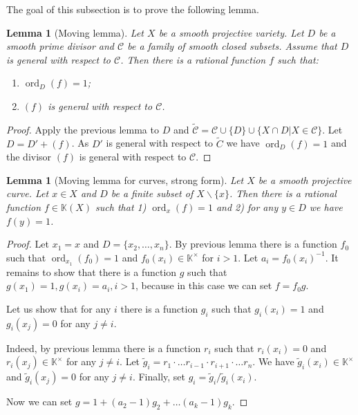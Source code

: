 \documentclass[12pt]{extarticle}
\newtheorem{lemma}[theorem]{Lemma}
\def\mb{\mathbb}
\def\mc{\mathcal}
\def\k{\mb K}
\def\t{\times}
\def\wt{\widetilde}
\def\bs{\backslash}
\DeclareMathOperator{\ord}{ord}
\begin{document}
The goal of this subsection is to prove the following lemma.

\begin{lemma}[Moving lemma]
\label{lemma:moving_lemma_final}
    Let $X$ be a smooth projective variety. Let $D$ be a smooth prime divisor and $\mc C$ be a family of smooth closed subsets. Assume that $D$ is general with respect to $\mc C$. Then there is a rational function $f$ such that:
    \begin{enumerate}
    \item $\ord_D(f)=1$;
        \item $(f)$ is general with respect to $\mc C$.
    \end{enumerate}
\end{lemma}

\begin{proof}
    Apply the previous lemma to $D$ and $\wt{\mc C}=\mc C\cup \{D\}\cup \{X\cap D|X\in \mc C\}$. Let $D=D'+(f)$. As $D'$ is general with respect to $\wt C$ we have $\ord_D(f)=1$ and the divisor $(f)$ is general with respect to $\mc C$.
\end{proof}

\begin{lemma}[Moving lemma for curves, strong form]
\label{lemma:moving_lemma_strong}
    Let $X$ be a smooth projective curve. Let $x\in X$ and $D$ be a finite subset of $X\bs\{x\}$. Then there is a rational function $f\in\k(X)$ such that 1) $\ord_x(f)=1$ and 2) for any $y\in D$ we have $f(y)=1$.
\end{lemma}

\begin{proof}
Let $x_1=x$ and $D=\{x_2,\dots, x_n\}$.
By previous lemma there is a function $f_0$ such that $\ord_{x_1}(f_0)=1$ and $f_0(x_i)\in\k^\t$ for $i>1$. Let $a_i=f_0(x_i)^{-1}$. It remains to show that there is a function $g$ such that $g(x_1)=1, g(x_i)=a_i, i>1$, because in this case we can set $f=f_0g$. 


Let us show that for any $i$ there is a function $g_i$ such that $g_i(x_i)=1$ and $g_i(x_j)=0$ for any $j\ne i$. 

Indeed, by previous lemma there is a function $r_{i}$ such that $r_{i}(x_i)=0$ and $r_i(x_j)\in \k^\t$ for any $j\ne i$. Let $\wt g_i=r_1\cdot\dots r_{i-1}\cdot r_{i+1}\cdot\dots r_n$. We have $\wt g_i(x_i)\in \k^\t$ and $\wt g_i(x_j)=0$ for any $j\ne i$. Finally, set $g_i=\wt g_i/\wt g_i(x_i)$.

Now we can set $g=1+(a_2-1)g_2+\dots (a_k-1)g_k$. 
\end{proof}
\end{document}
